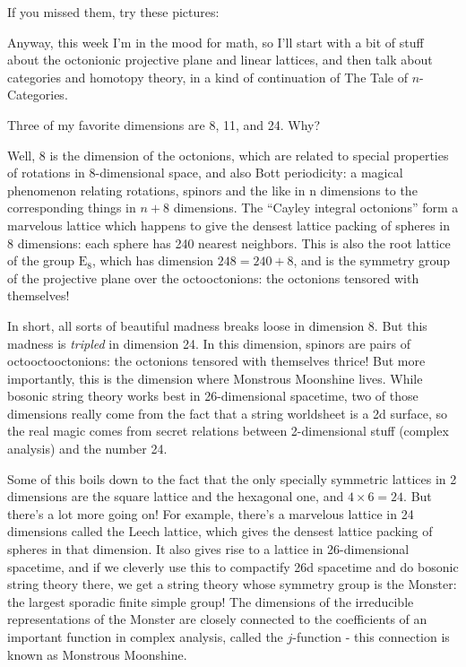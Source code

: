 \documentclass{article}
\def\tightlist{}
\renewcommand{\texttt}[1]{%
  \begingroup
  \ttfamily
  \begingroup\lccode`~=`/\lowercase{\endgroup\def~}{/\discretionary{}{}{}}%
  \begingroup\lccode`~=`[\lowercase{\endgroup\def~}{[\discretionary{}{}{}}%
  \begingroup\lccode`~=`.\lowercase{\endgroup\def~}{.\discretionary{}{}{}}%
  \catcode`/=\active\catcode`[=\active\catcode`.=\active
  \scantokens{#1\noexpand}%
  \endgroup
}
\begin{document}
If you missed them, try these pictures:


Anyway, this week I'm in the mood for math, so I'll start with a bit of
stuff about the octonionic projective plane and linear lattices, and
then talk about categories and homotopy theory, in a kind of
continuation of The Tale of \(n\)-Categories.

Three of my favorite dimensions are 8, 11, and 24. Why?

Well, 8 is the dimension of the octonions, which are related to special
properties of rotations in 8-dimensional space, and also Bott
periodicity: a magical phenomenon relating rotations, spinors and the
like in n dimensions to the corresponding things in \(n+8\) dimensions.
The ``Cayley integral octonions'' form a marvelous lattice which happens
to give the densest lattice packing of spheres in 8 dimensions: each
sphere has 240 nearest neighbors. This is also the root lattice of the
group \(\mathrm{E}_8\), which has dimension \(248 = 240+8\), and is the
symmetry group of the projective plane over the octooctonions: the
octonions tensored with themselves!

In short, all sorts of beautiful madness breaks loose in dimension 8.
But this madness is \emph{tripled} in dimension 24. In this dimension,
spinors are pairs of octooctooctonions: the octonions tensored with
themselves thrice! But more importantly, this is the dimension where
Monstrous Moonshine lives. While bosonic string theory works best in
26-dimensional spacetime, two of those dimensions really come from the
fact that a string worldsheet is a 2d surface, so the real magic comes
from secret relations between 2-dimensional stuff (complex analysis) and
the number 24.

Some of this boils down to the fact that the only specially symmetric
lattices in 2 dimensions are the square lattice and the hexagonal one,
and \(4 \times 6 = 24\). But there's a lot more going on! For example,
there's a marvelous lattice in 24 dimensions called the Leech lattice,
which gives the densest lattice packing of spheres in that dimension. It
also gives rise to a lattice in 26-dimensional spacetime, and if we
cleverly use this to compactify 26d spacetime and do bosonic string
theory there, we get a string theory whose symmetry group is the
Monster: the largest sporadic finite simple group! The dimensions of the
irreducible representations of the Monster are closely connected to the
coefficients of an important function in complex analysis, called the
\(j\)-function - this connection is known as Monstrous Moonshine.
\end{document}
